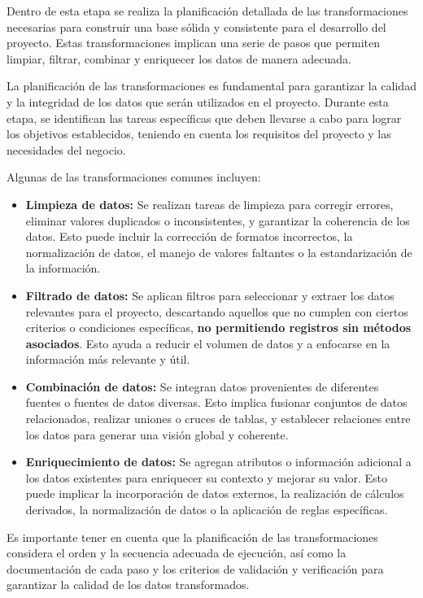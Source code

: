 Dentro de esta etapa se realiza la planificación detallada de las transformaciones necesarias para construir una base sólida y consistente para el desarrollo del proyecto. Estas transformaciones implican una serie de pasos que permiten limpiar, filtrar, combinar y enriquecer los datos de manera adecuada.

La planificación de las transformaciones es fundamental para garantizar la calidad y la integridad de los datos que serán utilizados en el proyecto. Durante esta etapa, se identifican las tareas específicas que deben llevarse a cabo para lograr los objetivos establecidos, teniendo en cuenta los requisitos del proyecto y las necesidades del negocio.

Algunas de las transformaciones comunes incluyen:

\begin{itemize}
    \item \textbf{Limpieza de datos:} Se realizan tareas de limpieza para corregir errores, eliminar valores duplicados o inconsistentes, y garantizar la coherencia de los datos. Esto puede incluir la corrección de formatos incorrectos, la normalización de datos, el manejo de valores faltantes o la estandarización de la información.

    \item \textbf{Filtrado de datos:} Se aplican filtros para seleccionar y extraer los datos relevantes para el proyecto, descartando aquellos que no cumplen con ciertos criterios o condiciones específicas, \textbf{no permitiendo registros sin métodos asociados}. Esto ayuda a reducir el volumen de datos y a enfocarse en la información más relevante y útil.

    \item \textbf{Combinación de datos:} Se integran datos provenientes de diferentes fuentes o fuentes de datos diversas. Esto implica fusionar conjuntos de datos relacionados, realizar uniones o cruces de tablas, y establecer relaciones entre los datos para generar una visión global y coherente.

    \item \textbf{Enriquecimiento de datos:} Se agregan atributos o información adicional a los datos existentes para enriquecer su contexto y mejorar su valor. Esto puede implicar la incorporación de datos externos, la realización de cálculos derivados, la normalización de datos o la aplicación de reglas específicas.
\end{itemize}


Es importante tener en cuenta que la planificación de las transformaciones considera el orden y la secuencia adecuada de ejecución, así como la documentación de cada paso y los criterios de validación y verificación para garantizar la calidad de los datos transformados.
